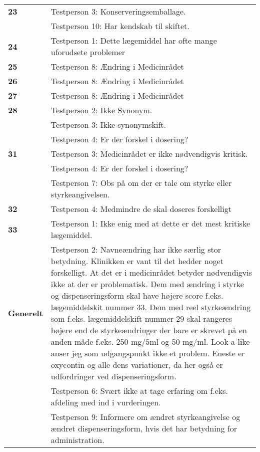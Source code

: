 \begin{longtable} {|p{2.2cm}|p{12cm}|}
\cellcolor[HTML]{C0C0C0} \textbf{23}\multirow{2}{*}{} & Testperson 3: Konserveringsemballage. \\ \cline{2-2}
\cellcolor[HTML]{C0C0C0}           & Testperson 10: Har kendskab til skiftet. \\ \hline
\cellcolor[HTML]{C0C0C0} \textbf{24} & Testperson 1: Dette lægemiddel har ofte mange uforudsete problemer \\ \hline
\cellcolor[HTML]{C0C0C0} \textbf{25} & Testperson 8: Ændring i Medicinrådet \\ \hline
\cellcolor[HTML]{C0C0C0} \textbf{26} & Testperson 8: Ændring i Medicinrådet \\ \hline
\cellcolor[HTML]{C0C0C0}   \textbf{27} & Testperson 8: Ændring i Medicinrådet \\ \hline
\cellcolor[HTML]{C0C0C0} \textbf{28}\multirow{3}{*}{} & Testperson 2: Ikke Synonym. \\ \cline{2-2}
\cellcolor[HTML]{C0C0C0}      & Testperson 3: Ikke synonymskift. \\ \cline{2-2}
 \cellcolor[HTML]{C0C0C0}                    & Testperson 4: Er der forskel i dosering? \\ \hline
\cellcolor[HTML]{C0C0C0} \textbf{31}\multirow{3}{*}{} & Testperson 3: Medicinrådet er ikke nødvendigvis kritisk. \\ \cline{2-2}
\cellcolor[HTML]{C0C0C0}     & Testperson 4: Er der forskel i dosering? \\ \cline{2-2}
\cellcolor[HTML]{C0C0C0}   & Testperson 7: Obs på om der er tale om styrke eller styrkeangivelsen. \\ \hline
\cellcolor[HTML]{C0C0C0}  \textbf{32} & Testperson 4: Medmindre de skal doseres forskelligt \\ \hline
\cellcolor[HTML]{C0C0C0} \textbf{33} & Testperson 1: Ikke enig med at dette er det mest kritiske lægemiddel. \\ \hline
\cellcolor[HTML]{C0C0C0} \textbf{Generelt}\multirow{3}{*} & Testperson 2: Navneændring har ikke særlig stor betydning. Klinikken er vant til det hedder noget forskelligt. At det er i medicinrådet betyder nødvendigvis ikke at der er problematisk. Dem med ændring i styrke og dispenseringsform skal have højere score f.eks. lægemiddelskit nummer 33.  Dem med reel styrkeændring som f.eks. lægemiddelskift nummer 29 skal rangeres højere end de styrkeændringer der bare er skrevet på en anden måde f.eks. 250 mg/5ml og 50 mg/ml. Look-a-like anser jeg som udgangspunkt ikke et problem. Eneste er oxycontin og alle dens variationer, da her også er udfordringer ved dispenseringsform.  \\ \cline{2-2}
\cellcolor[HTML]{C0C0C0}    & Testperson 6: Svært ikke at tage erfaring om f.eks. afdeling med ind i vurderingen. \\ \cline{2-2}
\cellcolor[HTML]{C0C0C0}                & Testperson 9: Informere om ændret styrkeangivelse og ændret dispenseringsform, hvis det har betydning for administration. \\ \hline
	\end{longtable}
	
